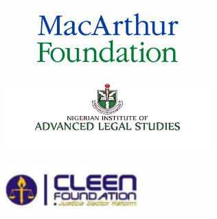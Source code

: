 \documentclass[
  letterpaper,
  DIV=11,
  numbers=noendperiod]{scrreprt}
\begin{document}
\begin{figure}

\begin{minipage}{0.50\linewidth}

\begin{figure}[H]

{\centering \includegraphics[width=3.125in,height=\textheight,keepaspectratio]{images/mous/mcarthur.png}

}


\end{figure}%

\end{minipage}%
%
\begin{minipage}{0.50\linewidth}

\begin{figure}[H]

{\centering \includegraphics[width=3.125in,height=\textheight,keepaspectratio]{images/mous/nias.png}

}


\end{figure}%

\end{minipage}%
\newline
\begin{minipage}{0.50\linewidth}

\begin{figure}[H]

{\centering \includegraphics[width=2.08333in,height=\textheight,keepaspectratio]{images/mous/cleen.png}

}
\end{figure}
\end{minipage}
\end{figure}
\end{document}
